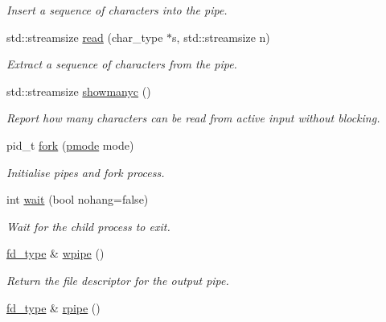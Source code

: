 \begin{DoxyCompactItemize}
\begin{DoxyCompactList}\small\item\em Insert a sequence of characters into the pipe. \end{DoxyCompactList}\item 
std\+::streamsize \mbox{\hyperlink{classredi_1_1basic__pstreambuf_a3ac98c1a7954de8c0c2833f3da30788b}{read}} (char\+\_\+type $\ast$s, std\+::streamsize n)
\begin{DoxyCompactList}\small\item\em Extract a sequence of characters from the pipe. \end{DoxyCompactList}\item 
\mbox{\label{classredi_1_1basic__pstreambuf_abdd03e965dfb0488d5329373350519a9}} 
std\+::streamsize \mbox{\hyperlink{classredi_1_1basic__pstreambuf_abdd03e965dfb0488d5329373350519a9}{showmanyc}} ()
\begin{DoxyCompactList}\small\item\em Report how many characters can be read from active input without blocking. \end{DoxyCompactList}\item 
pid\+\_\+t \mbox{\hyperlink{classredi_1_1basic__pstreambuf_a70a3b8c71fa2019eefff0ef6e8a92d5b}{fork}} (\mbox{\hyperlink{structredi_1_1pstreams_a1eae4aad88812af03a0fbb3ec13c50b7}{pmode}} mode)
\begin{DoxyCompactList}\small\item\em Initialise pipes and fork process. \end{DoxyCompactList}\item 
int \mbox{\hyperlink{classredi_1_1basic__pstreambuf_afa976526cfb7ea56e29afbee8ead68e1}{wait}} (bool nohang=false)
\begin{DoxyCompactList}\small\item\em Wait for the child process to exit. \end{DoxyCompactList}\item 
\mbox{\hyperlink{structredi_1_1pstreams_add0b7eaed16eb6c22a56012958d85b1d}{fd\+\_\+type}} \& \mbox{\hyperlink{classredi_1_1basic__pstreambuf_a982f0dcfc35efedf63c0906611060ba7}{wpipe}} ()
\begin{DoxyCompactList}\small\item\em Return the file descriptor for the output pipe. \end{DoxyCompactList}\item 
\mbox{\hyperlink{structredi_1_1pstreams_add0b7eaed16eb6c22a56012958d85b1d}{fd\+\_\+type}} \& \mbox{\hyperlink{classredi_1_1basic__pstreambuf_accdb0b3a802ffb924c66cfffed2563dd}{rpipe}} ()

\end{DoxyCompactItemize}
